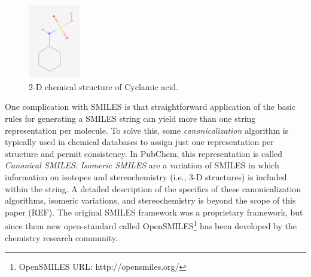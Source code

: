 \begin{figure}[htb]
        \centering
        \includegraphics[width=0.20\textwidth]{figures/cyclamic_acid.png}
        \caption{2-D chemical structure of Cyclamic acid.}
        \label{fig:cyclamic}
    \end{figure}
    
One complication with SMILES is that straightforward application of the basic rules for generating a SMILES string can yield more than one string representation per molecule. To solve this, some {\em canonicalization} algorithm is typically used in chemical databases to  assign just one representation per structure and permit consistency. In PubChem, this representation is called {\em Canonical SMILES}. 
{\em Isomeric SMILES} are a variation of SMILES in which information on isotopes and stereochemistry (i.e., 3-D structures) is included within the string. A detailed description of the specifics of these canonicalization algorithms, isomeric variations, and stereochemistry is beyond the scope of this paper (REF). The original SMILES framework was a proprietary framework, but since them new open-standard called OpenSMILES\footnote{OpenSMILES URL: http://opensmiles.org/} has been developed by the chemistry research community.
%
